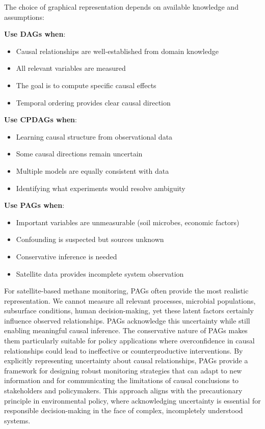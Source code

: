 The choice of graphical representation depends on available knowledge and assumptions:

\textbf{Use DAGs when}:
\begin{itemize}
	\item Causal relationships are well-established from domain knowledge
	\item All relevant variables are measured
	\item The goal is to compute specific causal effects
	\item Temporal ordering provides clear causal direction
\end{itemize}

\textbf{Use CPDAGs when}:
\begin{itemize}
	\item Learning causal structure from observational data
	\item Some causal directions remain uncertain
	\item Multiple models are equally consistent with data
	\item Identifying what experiments would resolve ambiguity
\end{itemize}

\textbf{Use PAGs when}:
\begin{itemize}
	\item Important variables are unmeasurable (soil microbes, economic factors)
	\item Confounding is suspected but sources unknown
	\item Conservative inference is needed
	\item Satellite data provides incomplete system observation
\end{itemize}

For satellite-based methane monitoring, PAGs often provide the most realistic representation. We cannot measure all relevant processes, microbial populations, subsurface conditions, human decision-making, yet these latent factors certainly influence observed relationships. PAGs acknowledge this uncertainty while still enabling meaningful causal inference. The conservative nature of PAGs makes them particularly suitable for policy applications where overconfidence in causal relationships could lead to ineffective or counterproductive interventions. By explicitly representing uncertainty about causal relationships, PAGs provide a framework for designing robust monitoring strategies that can adapt to new information and for communicating the limitations of causal conclusions to stakeholders and policymakers. This approach aligns with the precautionary principle in environmental policy, where acknowledging uncertainty is essential for responsible decision-making in the face of complex, incompletely understood systems.

